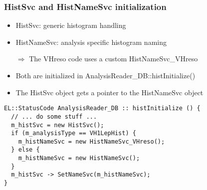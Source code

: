 \documentclass{beamer}
\begin{document}
\begin{frame}[fragile,t]
\frametitle{HistSvc and HistNameSvc initialization}
\begin{itemize}
 \item HistSvc: generic histogram handling
 \item HistNameSvc: analysis specific histogram naming
 \item[$\Rightarrow$] The VHreso code uses a custom HistNameSvc\_VHreso
 \item Both are initialized in AnalysisReader\_DB::histInitialize()
 \item The HistSvc object gets a pointer to the HistNameSvc object
\end{itemize}
\begin{center}
\begin{minipage}{0.9\textwidth}
{\tiny
\begin{lstlisting}
EL::StatusCode AnalysisReader_DB :: histInitialize () {
  // ... do some stuff ...
  m_histSvc = new HistSvc();
  if (m_analysisType == VH1LepHist) {
    m_histNameSvc = new HistNameSvc_VHreso();
  } else {
    m_histNameSvc = new HistNameSvc();
  }
  m_histSvc -> SetNameSvc(m_histNameSvc);
}
\end{lstlisting}
}
\end{minipage}
\end{center}
\end{frame}
\end{document}
